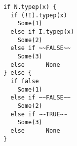 \begin{lstlisting}[style=scalaioScala]
if N.typep(x) {
  if (!I).typep(x)
    Some(1)
  else if I.typep(x)
    Some(2)
  else if ~~FALSE~~
    Some(3)
  else      None
} else {
  if false
    Some(1)
  else if ~~FALSE~~
    Some(2)
  else if ~~TRUE~~
    Some(3)
  else      None
}
\end{lstlisting}
